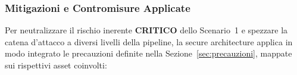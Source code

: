 \documentclass[11pt,a4paper]{article}
\begin{document}
%

\subsubsection{Mitigazioni e Contromisure Applicate}

Per neutralizzare il rischio inerente \textbf{CRITICO} dello Scenario~1 e spezzare la catena d'attacco a diversi livelli della pipeline, la secure architecture applica in modo integrato le precauzioni definite nella Sezione~\ref{sec:precauzioni}, mappate sui rispettivi asset coinvolti:
\end{document}
